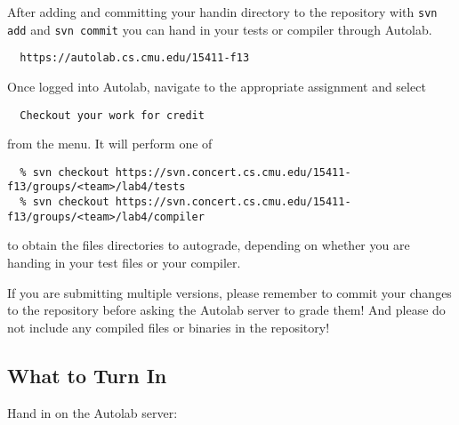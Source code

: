 \documentclass[11pt]{article}
\begin{document}
After adding and committing your handin directory to the
repository with \verb"svn add" and \verb"svn commit"
you can hand in your tests or compiler through Autolab.
\begin{verbatim}
  https://autolab.cs.cmu.edu/15411-f13
\end{verbatim}
Once logged into Autolab, navigate to the appropriate assignment and
select
\begin{verbatim}
  Checkout your work for credit
\end{verbatim}
from the menu.  It will perform one of
\begin{verbatim}
  % svn checkout https://svn.concert.cs.cmu.edu/15411-f13/groups/<team>/lab4/tests
  % svn checkout https://svn.concert.cs.cmu.edu/15411-f13/groups/<team>/lab4/compiler
\end{verbatim}
to obtain the files directories to autograde, depending on whether
you are handing in your test files or your compiler.

If you are submitting multiple versions, please remember to commit
your changes to the repository before asking the Autolab server to
grade them!  And please do not include any compiled files or binaries
in the repository!

\subsection*{What to Turn In}

Hand in on the Autolab server:
\end{document}

